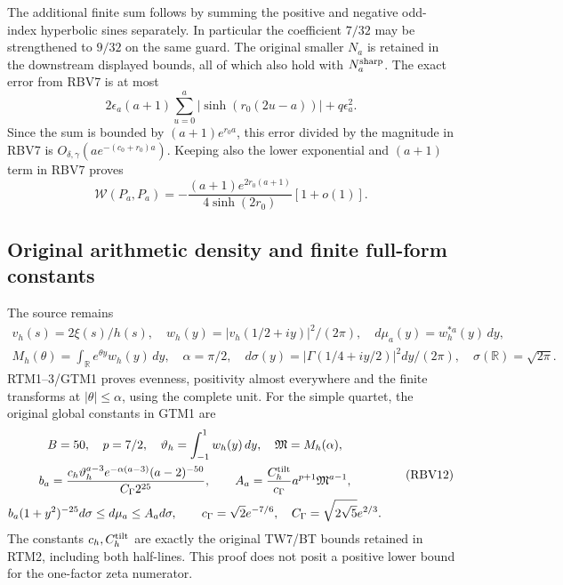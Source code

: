 The additional finite sum follows by summing the positive and
negative odd-index hyperbolic sines separately. In particular the
coefficient $7/32$ may be strengthened to $9/32$ on the same guard.
The original smaller $N_a$ is retained in the downstream displayed
bounds, all of which also hold with $N_a^{\rm sharp}$.
The exact error from RBV7 is at most
\[
2\epsilon_a(a+1)\sum_{u=0}^a|\sinh(r_0(2u-a))|
                         +q\epsilon_a^2.\tag{RBV9}
\]
Since the sum is bounded by $(a+1)e^{r_0a}$, this error divided by
the magnitude in RBV7 is
$O_{\delta,\gamma}(a e^{-(c_0+r_0)a})$.
Keeping also the lower exponential and $(a+1)$ term in RBV7 proves
\[
\mathcal W(P_a,P_a)
=-\frac{(a+1)e^{2r_0(a+1)}}{4\sinh(2r_0)}[1+o(1)].
\tag{RBV10}
\]

\subsection{Original arithmetic density and finite full-form constants}
The source remains
\[
\begin{gathered}
v_h(s)=2\xi(s)/h(s),\quad
w_h(y)=|v_h(1/2+iy)|^2/(2\pi),\quad
d\mu_a(y)=w_h^{*a}(y)\,dy,\\
M_h(\theta)=\int_{\mathbb R}e^{\theta y}w_h(y)\,dy,
\quad\alpha=\pi/2,\quad
d\sigma(y)=|\Gamma(1/4+iy/2)|^2dy/(2\pi),\quad
\sigma(\mathbb R)=\sqrt{2\pi}.
\end{gathered}\tag{RBV11}
\]
RTM1--3/GTM1 proves evenness, positivity almost everywhere and the
finite transforms at $|\theta|\le\alpha$, using the complete unit.
For the simple quartet, the original global constants in GTM1 are
\[
\begin{gathered}
B=50,\quad p=7/2,\quad
\vartheta_h=\int_{-1}^1w_h(y)\,dy,\quad\mathfrak M=M_h(\alpha),\\
b_a=\frac{c_h\vartheta_h^{a-3}e^{-\alpha(a-3)}(a-2)^{-50}}
 {C_\Gamma2^{25}},\qquad
A_a=\frac{C_h^{\rm tilt}}{c_\Gamma}a^{p+1}\mathfrak M^{a-1},\\
b_a(1+y^2)^{-25}d\sigma\le d\mu_a\le A_a d\sigma,\qquad
c_\Gamma=\sqrt2e^{-7/6},\quad C_\Gamma=\sqrt{2\sqrt5}e^{2/3}.
\end{gathered}\tag{RBV12}
\]
The constants $c_h,C_h^{\rm tilt}$ are exactly the original
TW7/BT bounds retained in RTM2, including both half-lines. This proof
does not posit a positive lower bound for the one-factor zeta numerator.

